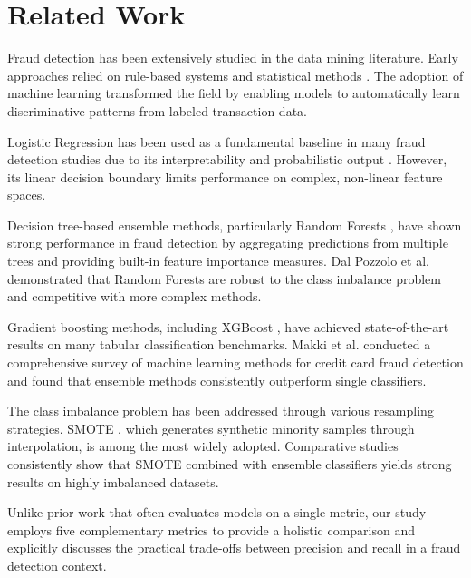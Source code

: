 \documentclass[conference]{IEEEtran}
\begin{document}
\section{Related Work}
\label{sec:related}

Fraud detection has been extensively studied in the data mining literature. Early approaches relied on rule-based systems and statistical methods \cite{bolton2002}. The adoption of machine learning transformed the field by enabling models to automatically learn discriminative patterns from labeled transaction data.

Logistic Regression has been used as a fundamental baseline in many fraud detection studies due to its interpretability and probabilistic output \cite{bhattacharyya2011}. However, its linear decision boundary limits performance on complex, non-linear feature spaces.

Decision tree-based ensemble methods, particularly Random Forests \cite{breiman2001}, have shown strong performance in fraud detection by aggregating predictions from multiple trees and providing built-in feature importance measures. Dal Pozzolo et al. \cite{dal2015} demonstrated that Random Forests are robust to the class imbalance problem and competitive with more complex methods.

Gradient boosting methods, including XGBoost \cite{chen2016}, have achieved state-of-the-art results on many tabular classification benchmarks. Makki et al. \cite{makki2019} conducted a comprehensive survey of machine learning methods for credit card fraud detection and found that ensemble methods consistently outperform single classifiers.

The class imbalance problem has been addressed through various resampling strategies. SMOTE \cite{chawla2002}, which generates synthetic minority samples through interpolation, is among the most widely adopted. Comparative studies \cite{fernandez2018} consistently show that SMOTE combined with ensemble classifiers yields strong results on highly imbalanced datasets.

Unlike prior work that often evaluates models on a single metric, our study employs five complementary metrics to provide a holistic comparison and explicitly discusses the practical trade-offs between precision and recall in a fraud detection context.

\end{document}
